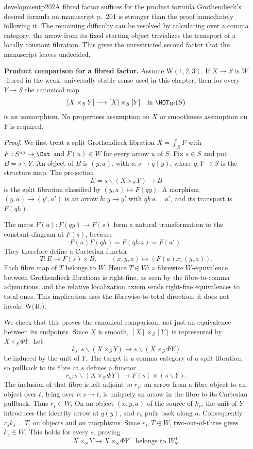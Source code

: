 \begin{dcomment}{development}{p202}{A fibred factor suffices for the product formula}
Grothendieck's desired formula on manuscript p.~201 is stronger than the proof immediately following it. The remaining difficulty can be resolved by calculating over a comma category: the arrow from its fixed starting object trivializes the transport of a locally constant fibration. This gives the unrestricted second factor that the manuscript leaves undecided.

\textbf{Product comparison for a fibred factor.}\ours\enspace
Assume W$(1,2,3)$. If $X\to S$ is $W$-fibred in the weak, universally stable sense used in this chapter, then for every $Y\to S$ the canonical map
\[
 [X\times_S Y]\longrightarrow [X]\times_S[Y]
 \quad\text{in }\HOT_W(S)
\]
is an isomorphism. No properness assumption on $X$ or smoothness assumption on $Y$ is required.

\emph{Proof.} We first treat a split Grothendieck fibration $X=\int_S F$ with $F:S^{\mathrm{op}}\to\Cat$ and $F(u)\in W$ for every arrow $u$ of $S$. Fix $s\in S$ and put $B=s\backslash Y$. An object of $B$ is $(y,a)$, with $a:s\to q(y)$, where $q:Y\to S$ is the structure map. The projection
\[
 E=s\backslash(X\times_S Y)\longrightarrow B
\]
is the split fibration classified by $(y,a)\mapsto F(qy)$. A morphism $(y,a)\to(y',a')$ is an arrow $h:y\to y'$ with $qh\,a=a'$, and its transport is $F(qh)$.

The maps $F(a):F(qy)\to F(s)$ form a natural transformation to the constant diagram at $F(s)$, because
\[
 F(a)F(qh)=F(qh\,a)=F(a').
\]
They therefore define a Cartesian functor
\[
 T:E\longrightarrow F(s)\times B,
 \qquad (x,y,a)\longmapsto (F(a)x,(y,a)).
\]
Each fibre map of $T$ belongs to $W$. Hence $T\in W$: a fibrewise $W$-equivalence between Grothendieck fibrations is right-fine, as seen by the fibre-to-comma adjunctions, and the relative localization axiom sends right-fine equivalences to total ones. This implication uses the fibrewise-to-total direction; it does not invoke W(4b).

We check that this proves the canonical comparison, not just an equivalence between its endpoints. Since $X$ is smooth, $[X]\times_S[Y]$ is represented by $X\times_S\Phi Y$. Let
\[
 k_s:s\backslash(X\times_S Y)
       \longrightarrow s\backslash(X\times_S\Phi Y)
\]
be induced by the unit of $Y$. The target is a comma category of a split fibration, so pullback to its fibre at $s$ defines a functor
\[
 r_s:s\backslash(X\times_S\Phi Y)
          \longrightarrow F(s)\times(s\backslash Y).
\]
The inclusion of that fibre is left adjoint to $r_s$: an arrow from a fibre object to an object over $t$, lying over $c:s\to t$, is uniquely an arrow in the fibre to its Cartesian pullback. Thus $r_s\in W$. On an object $(x,y,a)$ of the source of $k_s$, the unit of $Y$ introduces the identity arrow at $q(y)$, and $r_s$ pulls back along $a$. Consequently $r_s k_s=T$, on objects and on morphisms. Since $r_s,T\in W$, two-out-of-three gives $k_s\in W$. This holds for every $s$, proving
\[
 X\times_S Y\longrightarrow X\times_S\Phi Y
       \quad\text{belongs to }W_S^{\mathrm d}.
\]


\end{dcomment}
